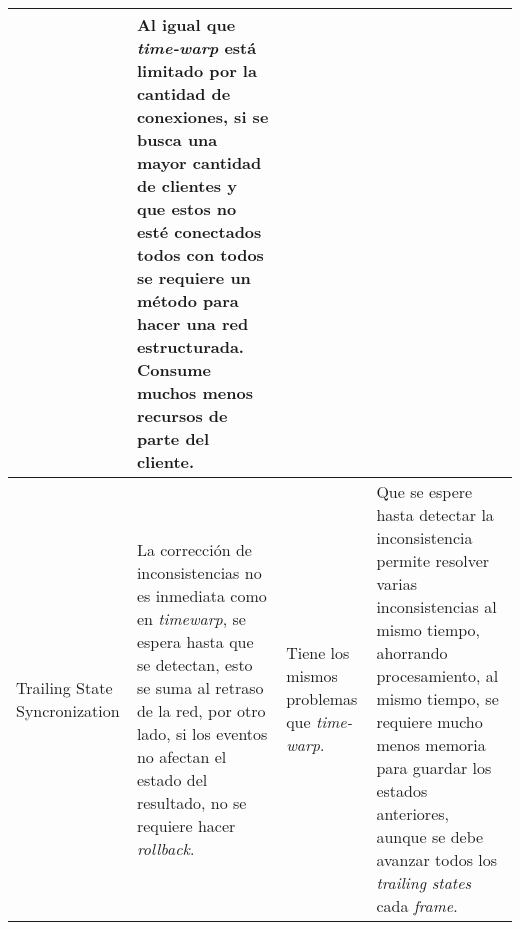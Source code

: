 \begin{longtable}{|p{2cm}|p{4cm}|p{4cm}|p{4cm}|}
&
Al igual que \emph{time-warp} está limitado por la cantidad de conexiones, si se busca una mayor cantidad de clientes y que estos no esté conectados todos con todos se requiere un método para hacer una red estructurada.
\newline Consume muchos menos recursos de parte del cliente.
\\ \hline
Trailing State Syncronization
&
La corrección de inconsistencias no es inmediata como en \emph{timewarp}, se espera hasta que se detectan, esto se suma al retraso de la red, por otro lado, si los eventos no afectan el estado del resultado, no se requiere hacer \emph{rollback}.
&
Tiene los mismos problemas que \emph{time-warp}.
&
Que se espere hasta detectar la inconsistencia permite resolver varias inconsistencias al mismo tiempo, ahorrando procesamiento, al mismo tiempo, se requiere mucho menos memoria para guardar los estados anteriores, aunque se debe avanzar todos los \emph{trailing states} cada \emph{frame}.
\\ \hline
\end{longtable}
\normalsize





